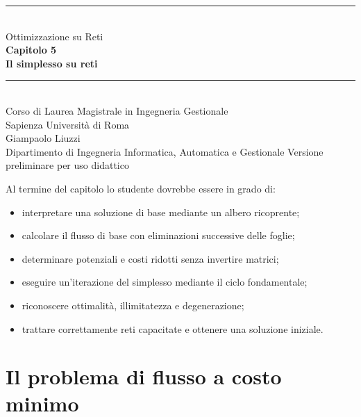 \documentclass[11pt,a4paper]{article}
\begin{document}
\hypersetup{pageanchor=false}
\begin{titlepage}
\centering\vspace*{1.6cm}
{\color{sapienzared}\rule{\textwidth}{1.2pt}}\\[1.1cm]
{\Large Ottimizzazione su Reti}\\[0.35cm]
{\huge\bfseries Capitolo 5}\\[0.45cm]
{\LARGE\bfseries Il simplesso su reti}\\[1.1cm]
{\color{sapienzared}\rule{0.72\textwidth}{0.8pt}}\\[1.1cm]
{\large Corso di Laurea Magistrale in Ingegneria Gestionale}\\[0.25cm]
{\large Sapienza Università di Roma}\\[1.2cm]
{\large Giampaolo Liuzzi}\\[0.25cm]
{\normalsize Dipartimento di Ingegneria Informatica, Automatica e Gestionale}
\vfill{\small Versione preliminare per uso didattico}
\end{titlepage}
\hypersetup{pageanchor=true}
\tableofcontents\newpage{}

\begin{learningbox}
Al termine del capitolo lo studente dovrebbe essere in grado di:
\begin{itemize}[nosep]
\item interpretare una soluzione di base mediante un albero ricoprente;
\item calcolare il flusso di base con eliminazioni successive delle foglie;
\item determinare potenziali e costi ridotti senza invertire matrici;
\item eseguire un'iterazione del simplesso mediante il ciclo fondamentale;
\item riconoscere ottimalità, illimitatezza e degenerazione;
\item trattare correttamente reti capacitate e ottenere una soluzione iniziale.
\end{itemize}
\end{learningbox}

\section{Il problema di flusso a costo minimo}
\end{document}
